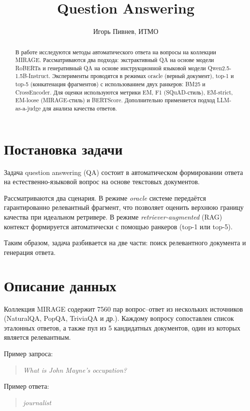 \documentclass[11pt]{article}
\title{Question Answering}
\author{Игорь Пивнев, ИТМО}
\begin{document}
\maketitle

\begin{abstract}
В работе исследуются методы автоматического ответа на вопросы на коллекции MIRAGE.
Рассматриваются два подхода: экстрактивный QA на основе модели RoBERTa и
генеративный QA на основе инструкционной языковой модели Qwen2.5-1.5B-Instruct.
Эксперименты проводятся в режимах oracle (верный документ), top-1 и top-5
(конкатенация фрагментов) с использованием двух ранкеров: BM25 и CrossEncoder.
Для оценки используются метрики EM, F1 (SQuAD-стиль), EM-strict, EM-loose
(MIRAGE-стиль) и BERTScore. Дополнительно применяется подход LLM-as-a-judge
для анализа качества ответов.
\end{abstract}

\section{Постановка задачи}

Задача question answering (QA) состоит в автоматическом формировании ответа
на естественно-языковой вопрос на основе текстовых документов.

Рассматриваются два сценария. В режиме \emph{oracle} системе передаётся
гарантированно релевантный фрагмент, что позволяет оценить верхнюю границу
качества при идеальном ретривере. В режиме \emph{retriever-augmented} (RAG)
контекст формируется автоматически с помощью ранкеров (top-1 или top-5).

Таким образом, задача разбивается на две части: поиск релевантного документа
и генерация ответа.

\section{Описание данных}

Коллекция MIRAGE содержит 7560 пар вопрос--ответ из нескольких источников
(NaturalQA, PopQA, TriviaQA и др.). Каждому вопросу сопоставлен список
эталонных ответов, а также пул из 5 кандидатных документов, один из которых
является релевантным.

Пример запроса:
\begin{quote}
\textit{What is John Mayne's occupation?}
\end{quote}

Пример ответа:
\begin{quote}
\textit{journalist}
\end{quote}
\end{document}
